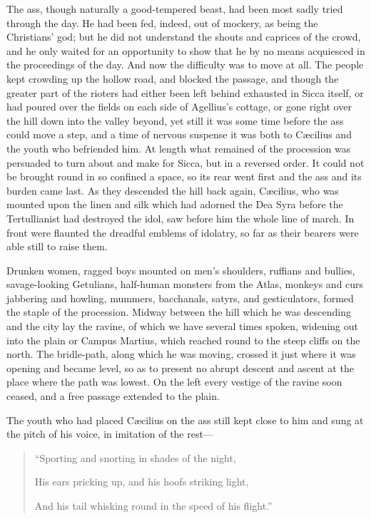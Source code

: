 The ass, though naturally a good-tempered beast, had been most
sadly tried through the day. He had been fed, indeed, out of mockery,
as being the Christians' god; but he did not understand the shouts and
caprices of the crowd, and he only waited for an opportunity to show
that he by no means acquiesced in the proceedings of the day. And now
the difficulty was to move at all. The people kept crowding up the
hollow road, and blocked the passage, and though the greater part of
the rioters had either been left behind exhausted in Sicca itself, or
had poured over the fields on each side of Agellius's cottage, or gone
right over the hill down into the valley beyond, yet still it was some
time before the ass could move a step, and a time of nervous suspense
it was both to Cæcilius and the youth who befriended him. At length
what remained of the procession was persuaded to turn about and make
for Sicca, but in a reversed order. It could not be brought round in
so confined a space, so its rear went first and the ass and its burden
came last. As they descended the hill back again, Cæcilius, who was
mounted upon the linen and silk which had adorned the Dea Syra before
the Tertullianist had destroyed the idol, saw before him the whole
line of march. In front were flaunted the dreadful emblems of
idolatry, so far as their bearers were able still to raise them.

Drunken women, ragged boys mounted on men's shoulders, ruffians and
bullies, savage-looking Getulians, half-human monsters from the
Atlas, monkeys and curs jabbering and howling, mummers, bacchanals,
satyrs, and gesticulators, formed the staple of the procession. Midway
between the hill which he was descending and the city lay the ravine,
of which we have several times spoken, widening out into the plain or
Campus Martius, which reached round to the steep cliffs on the north.
The bridle-path, along which he was moving, crossed it just where it
was opening and became level, so as to present no abrupt descent and
ascent at the place where the path was lowest. On the left every
vestige of the ravine soon ceased, and a free passage extended to the
plain.

The youth who had placed Cæcilius on the ass still kept close to
him and sung at the pitch of his voice, in imitation of the rest—

\begin{quote}

``Sporting and snorting in shades of the night,

His ears pricking up, and his hoofs striking light,

And his tail whisking round in the speed of his flight.''

\end{quote}

